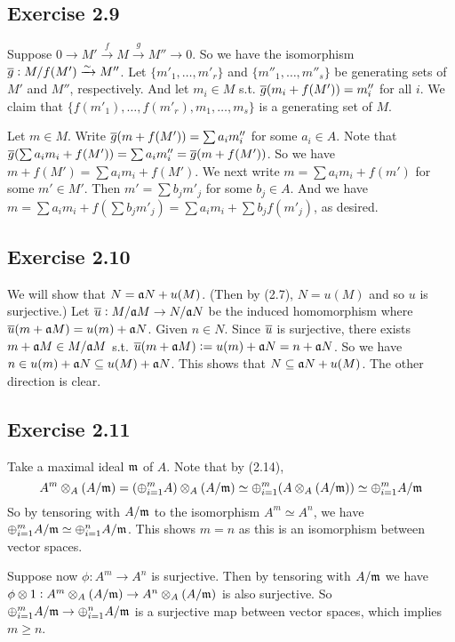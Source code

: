 \documentclass[../A&M.tex]{subfiles}
\begin{document}
\subsection*{Exercise 2.9}

Suppose $0 \to M' \overset{f}{\to} M \overset{g}{\to} M'' \to 0$. So we have the isomorphism $\overline{g}: M/f(M') \xrightarrow{\sim} M''$. Let $\{m'_1,\ldots,m'_r\}$ and $\{m''_1,\ldots,m''_s\}$ be generating sets of $M'$ and $M''$, respectively. And let $m_i \in M$ s.t. $\overline{g}(m_i + f(M')) = m''_i$ for all $i$. We claim that $\{f(m'_1),\ldots,f(m'_r),m_1,\ldots,m_s\}$ is a generating set of $M$.

Let $m\in M$. Write $\overline{g}(m+f(M')) = \sum a_im''_i$ for some $a_i \in A$. Note that $\overline{g}(\sum a_im_i + f(M')) = \sum a_im''_i = \overline{g}(m+f(M'))$. So we have $m+f(M') = \sum a_im_i + f(M')$. We next write $m = \sum a_im_i + f(m')$ for some $m'\in M'$. Then $m' = \sum b_j m'_j$ for some $b_j \in A$. And we have $m = \sum a_im_i + f( \sum b_j m'_j) = \sum a_im_i + \sum b_jf(m'_j)$, as desired.

\subsection*{Exercise 2.10}

We will show that $N = \mathfrak{a} N + u(M)$. (Then by (2.7), $N = u(M)$ and so $u$ is surjective.) Let $\overline{u} : M/\mathfrak{a} M \to N/\mathfrak{a} N$ be the induced homomorphism where $\overline{u}(m+\mathfrak{a} M) = u(m) + \mathfrak{a} N$. Given $n\in N$. Since $\overline{u}$ is surjective, there exists $m+\mathfrak{a} M \in M/\mathfrak{a} M$ s.t. $\overline{u}(m+\mathfrak{a} M) := u(m) + \mathfrak{a} N = n + \mathfrak{a} N$. So we have $n \in u(m) + \mathfrak{a} N \subseteq u(M) + \mathfrak{a} N$. This shows that $N \subseteq \mathfrak{a} N + u(M)$. The other direction is clear.

\subsection*{Exercise 2.11}

Take a maximal ideal $\mathfrak{m}$ of $A$. Note that by (2.14),
$$
A^m \otimes_A (A/\mathfrak{m}) = (\oplus_{i=1}^m A) \otimes_A (A/\mathfrak{m}) \simeq \oplus_{i=1}^m (A \otimes_A (A/\mathfrak{m})) \simeq \oplus_{i=1}^m A/\mathfrak{m}
$$
So by tensoring with $A/\mathfrak{m}$ to the isomorphism $A^m \simeq A^n$, we have $\oplus_{i=1}^m A/\mathfrak{m} \simeq \oplus_{i=1}^n A/\mathfrak{m}$. This shows $m=n$ as this is an isomorphism between vector spaces.

Suppose now $\phi : A^m \to A^n$ is surjective. Then by tensoring with $A/\mathfrak{m}$ we have $\phi \otimes 1: A^m \otimes_A (A/\mathfrak{m}) \to A^n \otimes_A (A/\mathfrak{m})$ is also surjective. So $\oplus_{i=1}^m A/\mathfrak{m} \to \oplus_{i=1}^n A/\mathfrak{m}$ is a surjective map between vector spaces, which implies $m\geq n$.
\end{document}
